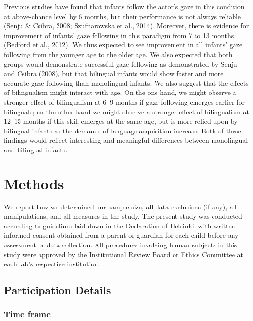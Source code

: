 \documentclass[english,,man,floatsintext]{apa6}
\begin{document}
Previous studies have found that infants follow the actor's gaze in this condition at above-chance level by 6 months, but their performance is not always reliable (Senju \& Csibra, 2008; Szufnarowska et al., 2014). Moreover, there is evidence for improvement of infants' gaze following in this paradigm from 7 to 13 months (Bedford et al., 2012). We thus expected to see improvement in all infants' gaze following from the younger age to the older age. We also expected that both groups would demonstrate successful gaze following as demonstrated by Senju and Csibra (2008), but that bilingual infants would show faster and more accurate gaze following than monolingual infants. We also suggest that the effects of bilingualism might interact with age. On the one hand, we might observe a stronger effect of bilingualism at 6--9 months if gaze following emerges earlier for bilinguals; on the other hand we might observe a stronger effect of bilingualism at 12--15 months if this skill emerges at the same age, but is more relied upon by bilingual infants as the demands of language acquisition increase. Both of these findings would reflect interesting and meaningful differences between monolingual and bilingual infants.

\hypertarget{methods}{%
\section{Methods}\label{methods}}

We report how we determined our sample size, all data exclusions (if any), all manipulations, and all measures in the study. The present study was conducted according to guidelines laid down in the Declaration of Helsinki, with written informed consent obtained from a parent or guardian for each child before any assessment or data collection. All procedures involving human subjects in this study were approved by the Institutional Review Board or Ethics Committee at each lab's respective institution.

\hypertarget{participation-details}{%
\subsection{Participation Details}\label{participation-details}}

\hypertarget{time-frame}{%
\subsubsection{Time frame}\label{time-frame}}
\end{document}
